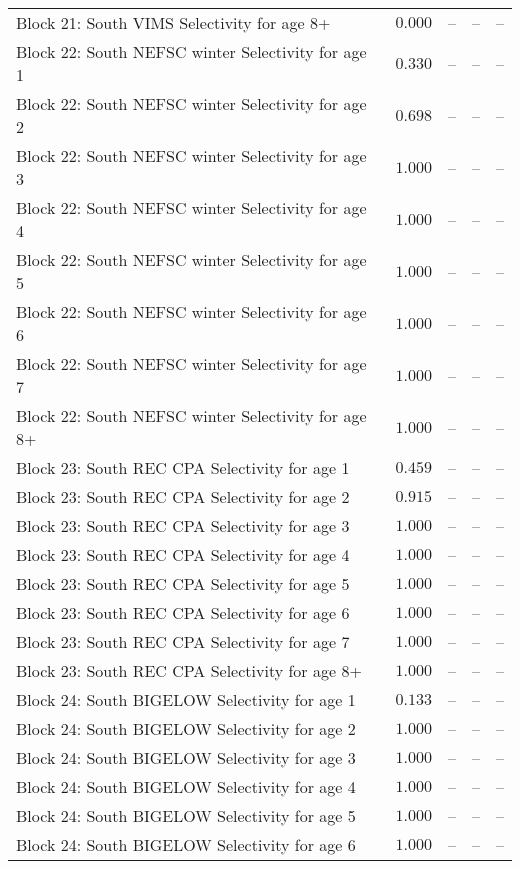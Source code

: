 \documentclass[
]{article}
\begin{document}
\begin{landscape}
\begin{longtable}[t]{lrrrr}
Block 21: South VIMS Selectivity for age 8+ & $0.000$ & -- & -- & --\\
\addlinespace
Block 22: South NEFSC winter Selectivity for age 1 & $0.330$ & -- & -- & --\\
Block 22: South NEFSC winter Selectivity for age 2 & $0.698$ & -- & -- & --\\
Block 22: South NEFSC winter Selectivity for age 3 & $1.000$ & -- & -- & --\\
Block 22: South NEFSC winter Selectivity for age 4 & $1.000$ & -- & -- & --\\
Block 22: South NEFSC winter Selectivity for age 5 & $1.000$ & -- & -- & --\\
\addlinespace
Block 22: South NEFSC winter Selectivity for age 6 & $1.000$ & -- & -- & --\\
Block 22: South NEFSC winter Selectivity for age 7 & $1.000$ & -- & -- & --\\
Block 22: South NEFSC winter Selectivity for age 8+ & $1.000$ & -- & -- & --\\
Block 23: South REC CPA Selectivity for age 1 & $0.459$ & -- & -- & --\\
Block 23: South REC CPA Selectivity for age 2 & $0.915$ & -- & -- & --\\
\addlinespace
Block 23: South REC CPA Selectivity for age 3 & $1.000$ & -- & -- & --\\
Block 23: South REC CPA Selectivity for age 4 & $1.000$ & -- & -- & --\\
Block 23: South REC CPA Selectivity for age 5 & $1.000$ & -- & -- & --\\
Block 23: South REC CPA Selectivity for age 6 & $1.000$ & -- & -- & --\\
Block 23: South REC CPA Selectivity for age 7 & $1.000$ & -- & -- & --\\
\addlinespace
Block 23: South REC CPA Selectivity for age 8+ & $1.000$ & -- & -- & --\\
Block 24: South BIGELOW Selectivity for age 1 & $0.133$ & -- & -- & --\\
Block 24: South BIGELOW Selectivity for age 2 & $1.000$ & -- & -- & --\\
Block 24: South BIGELOW Selectivity for age 3 & $1.000$ & -- & -- & --\\
Block 24: South BIGELOW Selectivity for age 4 & $1.000$ & -- & -- & --\\
\addlinespace
Block 24: South BIGELOW Selectivity for age 5 & $1.000$ & -- & -- & --\\
Block 24: South BIGELOW Selectivity for age 6 & $1.000$ & -- & -- & --\\

\end{longtable}
\end{landscape}
\end{document}
